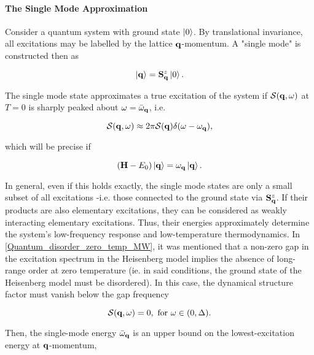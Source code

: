 \paragraph{The Single Mode Approximation}

Consider a quantum system with ground state $\ket{0}$. By translational invariance, all excitations may be labelled by the lattice ${\bf q}$-momentum. A "single mode" is constructed then as 

\begin{equation}
    \ket{{\bf q}} = {\bf S}^z_{{\bf q}} \ket{0}.
\end{equation}

The single mode state approximates a true excitation of the system if $\mathcal{S}({\bf q}, \omega)$ at $T = 0$ is sharply peaked about $\omega = \bar{\omega}_{\bf q}$, i.e.

\begin{equation}
    \mathcal{S}({\bf q}, \omega) \approx 2\pi \mathcal{S}({\bf q}) \delta(\omega- \omega_{\bf q}),
\end{equation}

which will be precise if 

\begin{equation}
    ({\bf H} - E_0)\ket{{\bf q}} = \omega_{{\bf q}} \ket{{\bf q}}.
\end{equation}

In general, even if this holds exactly, the single mode states are only a small subset of all excitations -i.e. those connected to the ground state via ${\bf S}^z_{\bf q}$. If their products are also elementary excitations, they can be considered as weakly interacting elementary excitations. Thus, their energies approximately determine the system's low-frequency response and low-temperature thermodynamics. In \cref{Quantum_disorder_zero_temp_MW}, it was mentioned that a non-zero gap in the excitation spectrum in the Heisenberg model implies the absence of long-range order at zero temperature (ie. in said conditions, the ground state of the Heisenberg model must be disordered). In this case, the dynamical structure factor must vanish below the gap frequency 

\begin{equation}
    \mathcal{S}({\bf q}, \omega) = 0, \textnormal{ for } \omega \in (0, \Delta).
\end{equation}

Then, the single-mode energy $\bar{\omega}_{{\bf q}}$ is an upper bound on the lowest-excitation energy at ${\bf q}$-momentum,

